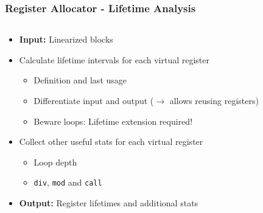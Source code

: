 \documentclass[navbaroff,en]{sdqbeamer}
\begin{document}
\begin{frame}
\frametitle{Register Allocator - Lifetime Analysis}

\begin{columns}
	\begin{column}{0.65\textwidth}
		\begin{itemize}
			\item \textbf{Input:} Linearized blocks
			\item Calculate lifetime intervals for each virtual register 
			\begin{itemize}
				\item Definition and last usage
				\item Differentiate input and output ($\rightarrow$ allows reusing registers)
				\item Beware loops: Lifetime extension required!
			\end{itemize}
			\item Collect other useful stats for each virtual register
			\begin{itemize}
				\item Loop depth
				\item \texttt{div}, \texttt{mod} and \texttt{call}
			\end{itemize}
			\item \textbf{Output:} Register lifetimes and additional stats
		\end{itemize}
	\end{column}
	

\end{columns}
\end{frame}
\end{document}
